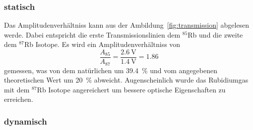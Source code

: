 \subsubsection{statisch}%
\label{ssub:statisch}
Das Amplitudenverhältniss kann aus der Ambildung~\ref{fig:transmission} abgelesen werde.
Dabei entspricht die erste Transmissionslinien dem $^{85}$Rb und die zweite dem
$^{87}$Rb Isotope.  Es wird ein Amplitudenverhältniss von 
\begin{equation}
	\frac{A_{85}}{A_{87}} = \frac{\SI{2.6}{\volt}}{\SI{1.4}{\volt}} = 1.86 
\end{equation}
gemessen, was von dem natürlichen um \SI{39.4}{\percent} und vom angegebenen
theoretischen Wert um \SI{20}{\percent} abweicht.
Augenscheinlich wurde das Rubidiumgas mit dem $^{87}$Rb Isotope angereichert um
bessere optische Eigenschaften zu erreichen.


\subsubsection{dynamisch}%
\label{ssub:dynamisch}


